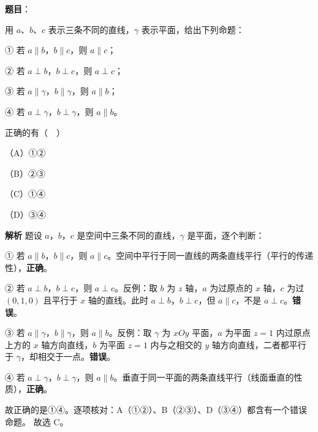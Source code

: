 \begin{answer}

\textbf{题目}：

用 $a$、$b$、$c$ 表示三条不同的直线，$\gamma$ 表示平面，给出下列命题：

① 若 $a\parallel b$，$b\parallel c$，则 $a\parallel c$；

② 若 $a\perp b$，$b\perp c$，则 $a\perp c$；

③ 若 $a\parallel\gamma$，$b\parallel\gamma$，则 $a\parallel b$；

④ 若 $a\perp\gamma$，$b\perp\gamma$，则 $a\parallel b$。

正确的有（　）

（A）①②

（B）②③

（C）①④

（D）③④

\textbf{解析}
题设 $a$，$b$，$c$ 是空间中三条不同的直线，$\gamma$ 是平面，逐个判断：

① 若 $a\parallel b$，$b\parallel c$，则 $a\parallel c$。空间中平行于同一直线的两条直线平行（平行的传递性），\textbf{正确}。

② 若 $a\perp b$，$b\perp c$，则 $a\perp c$。反例：取 $b$ 为 $z$ 轴，$a$ 为过原点的 $x$ 轴，$c$ 为过 $(0,1,0)$ 且平行于 $x$ 轴的直线。此时 $a\perp b$，$b\perp c$，但 $a\parallel c$，不是 $a\perp c$。\textbf{错误}。

③ 若 $a\parallel\gamma$，$b\parallel\gamma$，则 $a\parallel b$。反例：取 $\gamma$ 为 $xOy$ 平面，$a$ 为平面 $z=1$ 内过原点上方的 $x$ 轴方向直线，$b$ 为平面 $z=1$ 内与之相交的 $y$ 轴方向直线，二者都平行于 $\gamma$，却相交于一点。\textbf{错误}。

④ 若 $a\perp\gamma$，$b\perp\gamma$，则 $a\parallel b$。垂直于同一平面的两条直线平行（线面垂直的性质），\textbf{正确}。

故正确的是①④。逐项核对：A（①②）、B（②③）、D（③④）都含有一个错误命题。
故选 C。


\end{answer}
